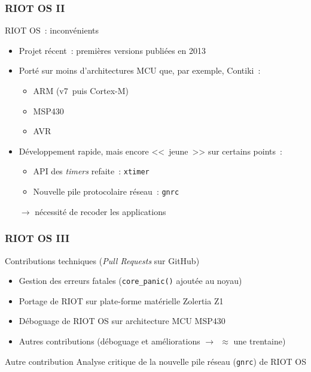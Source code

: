 \documentclass[10pt,c]{beamer}
\newcommand{\lang}[1]{\textit{#1}}
\begin{document}
\begin{frame}[label=RIOT2]
\frametitle{RIOT OS II}

\begin{block}{RIOT OS~: inconvénients}
\begin{itemize}
\item Projet récent~: premières versions publiées en 2013
\item Porté sur moins d'architectures MCU que, par exemple, Contiki~:
  \begin{itemize}
  \item ARM (v7~puis Cortex-M)
  \item MSP430
  \item AVR
  \end{itemize}
\item Développement rapide, mais encore <<~jeune~>> sur certains points~:
  \begin{itemize}
  \item API des \lang{timers} refaite~: \texttt{xtimer}
  \item Nouvelle pile protocolaire réseau~: \texttt{gnrc}
  \end{itemize}
 $\rightarrow$ nécessité de recoder les applications
\end{itemize}
\end{block}

\end{frame}

\begin{frame}[label=RIOT3]
\frametitle{RIOT OS III}

\vspace{-0.25cm}

\begin{exampleblock}{Contributions techniques (\lang{Pull Requests}
                     sur GitHub)}
\begin{itemize}
\item Gestion des erreurs fatales (\texttt{core\_panic()} ajoutée
       au noyau)
\item Portage de RIOT sur plate-forme matérielle Zolertia Z1
\item Déboguage de RIOT OS sur architecture MCU MSP430
\item Autres contributions {\small (déboguage et améliorations
       $\rightarrow\ \ \approx$ une trentaine)}
\end{itemize}
\end{exampleblock}

\begin{block}{Autre contribution}
Analyse critique de la nouvelle pile réseau (\texttt{gnrc}) de RIOT OS
\end{block}

\end{frame}
\end{document}
